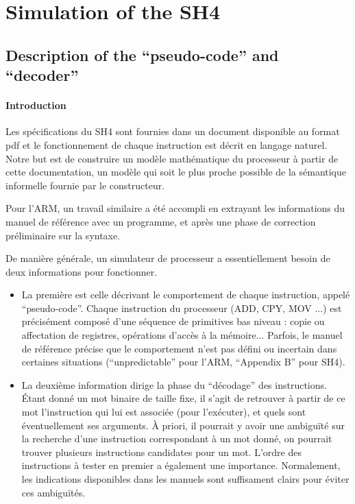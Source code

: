 \documentclass[a4paper, 11pt]{article}
\begin{document}
\section{Simulation of the SH4}

  \subsection{Description of the ``pseudo-code'' and ``decoder''}
\paragraph{Introduction}
Les spécifications du SH4 sont fournies dans un document disponible au format pdf et le fonctionnement de chaque instruction est décrit en langage naturel. Notre but est de construire un modèle mathématique du processeur à partir de cette documentation, un modèle qui soit le plus proche possible de la sémantique informelle fournie par le constructeur.

Pour l'ARM, un travail similaire a été accompli en extrayant les informations du manuel de référence avec un programme, et après une phase de correction préliminaire sur la syntaxe.

De manière générale, un simulateur de processeur a essentiellement besoin de deux informations pour fonctionner.
\begin{itemize}
\item La première est celle décrivant le comportement de chaque instruction, appelé ``pseudo-code''. Chaque instruction du processeur (ADD, CPY, MOV ...) est précisément composé d'une séquence de primitives bas niveau : copie ou affectation de registres, opérations d'accès à la mémoire... Parfois, le manuel de référence précise que le comportement n'est pas défini ou incertain dans certaines situations (``unpredictable'' pour l'ARM, ``Appendix B'' pour SH4).
\item La deuxième information dirige la phase du ``décodage'' des instructions. Étant donné un mot binaire de taille fixe, il s'agit de retrouver à partir de ce mot l'instruction qui lui est associée (pour l'exécuter), et quels sont éventuellement ses arguments. À priori, il pourrait y avoir une ambiguïté sur la recherche d'une instruction correspondant à un mot donné, on pourrait trouver plusieurs instructions candidates pour un mot. L'ordre des instructions à tester en premier a également une importance. Normalement, les indications disponibles dans les manuels sont suffisament clairs pour éviter ces ambiguïtés.
\end{itemize}
\end{document}
